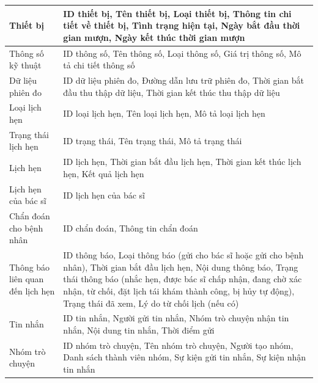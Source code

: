 \begin{table}[H]
\begin{tabularx}{\textwidth}{|p{4.5cm}|X|}
		\hline
		Thiết bị                         &
		ID thiết bị, Tên thiết bị, Loại thiết bị, Thông tin chi tiết về thiết bị, Tình trạng hiện tại, Ngày bắt đầu thời gian mượn, Ngày kết thúc thời gian mượn                                           \\
		\hline
		Thông số kỹ thuật                &
		ID thông số, Tên thông số, Loại thông số, Giá trị thông số, Mô tả chi tiết thông số                                                                    \\
		\hline
		Dữ liệu phiên đo                 &
		ID dữ liệu phiên đo, Đường dẫn lưu trữ phiên đo, Thời gian bắt đầu thu thập dữ liệu, Thời gian kết thúc thu thập dữ liệu                                          \\
		\hline
		Loại lịch hẹn                    &
		ID loại lịch hẹn, Tên loại lịch hẹn, Mô tả loại lịch hẹn                                                                                          \\
		\hline
		Trạng thái lịch hẹn              &
		ID trạng thái, Tên trạng thái, Mô tả trạng thái                                                                                                   \\
		\hline
		Lịch hẹn                         &
		ID lịch hẹn, Thời gian bắt đầu lịch hẹn, Thời gian kết thúc lịch hẹn, Kết quả lịch hẹn                                                            \\
		\hline
		Lịch hẹn của bác sĩ              &
		ID lịch hẹn của bác sĩ                                                                                                                            \\
		\hline
		Chẩn đoán cho bệnh nhân          &
		ID chẩn đoán, Thông tin chẩn đoán                                                                                                                 \\
		\hline
		Thông báo liên quan đến lịch hẹn &
		ID thông báo, Loại thông báo (gửi cho bác sĩ hoặc gửi cho bệnh nhân), Thời gian bắt đầu lịch hẹn, Nội dung thông báo,
		Trạng thái thông báo (nhắc hẹn, được bác sĩ chấp nhận, đang chờ xác nhận, từ chối, đặt lịch tái khám thành công, bị hủy tự động),
		Trạng thái đã xem, Lý do từ chối lịch (nếu có)                                                                                                    \\
		\hline
		Tin nhắn                         &
		ID tin nhắn, Người gửi tin nhắn, Nhóm trò chuyện nhận tin nhắn, Nội dung tin nhắn, Thời điểm gửi										 \\
		\hline
		Nhóm trò chuyện                  &
		ID nhóm trò chuyện, Tên nhóm trò chuyện, Người tạo nhóm, Danh sách thành viên nhóm, Sự kiện gửi tin nhắn, Sự kiện nhận tin nhắn                             \\
		\hline
	\end{tabularx}
\end{table}

